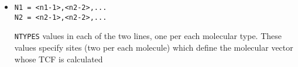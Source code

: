 \documentclass{article}
\begin{document}
\begin{itemize}
\begin{itemize}
\end{itemize}

\item
\begin{verbatim}
N1 = <n1-1>,<n2-2>,...
N2 = <n2-1>,<n2-2>,...
\end{verbatim}

\verb|NTYPES| values in each of the two lines, one per each molecular type.
These values specify sites (two per each molecule) which define the
molecular vector whose TCF is calculated

\end{itemize}
\end{document}
